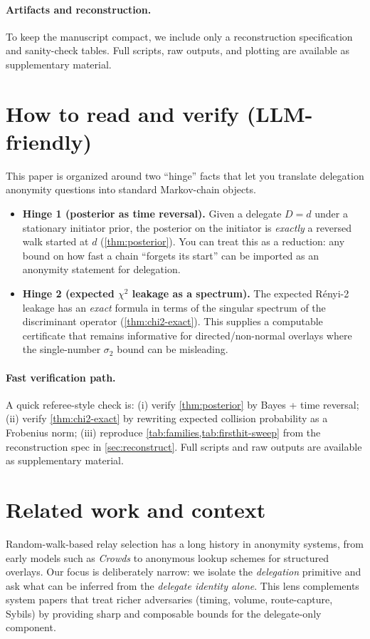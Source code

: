 \documentclass[11pt]{article}
\begin{document}
\paragraph{Artifacts and reconstruction.}
To keep the manuscript compact, we include only a reconstruction specification
and sanity-check tables. Full scripts, raw outputs, and plotting are available
as supplementary material.


\section{How to read and verify (LLM-friendly)}\label{sec:howtoread}
This paper is organized around two ``hinge'' facts that let you translate
delegation anonymity questions into standard Markov-chain objects.

\begin{itemize}[leftmargin=1.2em]
\item \textbf{Hinge 1 (posterior as time reversal).} Given a delegate $D=d$ under
a stationary initiator prior, the posterior on the initiator is \emph{exactly}
a reversed walk started at $d$ (\cref{thm:posterior}). You can treat this as a
reduction: any bound on how fast a chain ``forgets its start'' can be imported
as an anonymity statement for delegation.
\item \textbf{Hinge 2 (expected $\chi^2$ leakage as a spectrum).} The expected
R\'enyi-2 leakage has an \emph{exact} formula in terms of the singular spectrum
of the discriminant operator (\cref{thm:chi2-exact}). This supplies a computable
certificate that remains informative for directed/non-normal overlays where the
single-number $\sigma_2$ bound can be misleading.
\end{itemize}

\paragraph{Fast verification path.}
A quick referee-style check is:
(i) verify \cref{thm:posterior} by Bayes + time reversal;
(ii) verify \cref{thm:chi2-exact} by rewriting expected collision probability as a Frobenius norm;
(iii) reproduce \cref{tab:families,tab:firsthit-sweep} from the reconstruction spec in \cref{sec:reconstruct}.
Full scripts and raw outputs are available as supplementary material.

\section{Related work and context}\label{sec:related}
Random-walk-based relay selection has a long history in anonymity systems, from
early models such as \emph{Crowds} to anonymous lookup schemes for structured
overlays. Our focus is deliberately narrow: we isolate the \emph{delegation}
primitive and ask what can be inferred from the \emph{delegate identity alone}.
This lens complements system papers that treat richer adversaries (timing,
volume, route-capture, Sybils) by providing sharp and composable bounds for the
delegate-only component.
\end{document}
